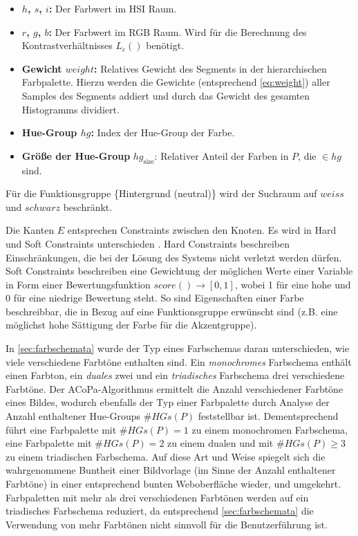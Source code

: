 \begin{itemize}
	\item \textbf{$h$, $s$, $i$:} Der Farbwert im HSI Raum.
	\item \textbf{$r$, $g$, $b$:} Der Farbwert im RGB Raum. Wird für die Berechnung des Kontrastverhältnisses $L_c()$ benötigt.
	\item \textbf{Gewicht $weight$:} Relatives Gewicht des Segments in der hierarchischen Farbpalette. Hierzu werden die Gewichte (entsprechend \autoref{eq:weight}) aller Samples des Segments addiert und durch das Gewicht des gesamten Histogramms dividiert.
	\item \textbf{Hue-Group $hg$:} Index der Hue-Group der Farbe.
	\item \textbf{Größe der Hue-Group} $hg_\text{size}$: Relativer Anteil der Farben in $P$, die $\in hg$ sind.
\end{itemize}

Für die Funktionsgruppe \{Hintergrund (neutral)\} wird der Suchraum auf $weiss$ und $schwarz$ beschränkt.

Die Kanten $E$ entsprechen Constraints zwischen den Knoten. Es wird in Hard und Soft Constraints unterschieden \citep{patterns}. Hard Constraints beschreiben Einschränkungen, die bei der Lösung des Systems nicht verletzt werden dürfen. Soft Constraints beschreiben eine Gewichtung der möglichen Werte einer Variable in Form einer Bewertungsfunktion $score() \to [0, 1]$, wobei 1 für eine hohe und 0 für eine niedrige Bewertung steht. So sind Eigenschaften einer Farbe beschreibbar, die in Bezug auf eine Funktionsgruppe erwünscht sind (z.B. eine möglichst hohe Sättigung der Farbe für die Akzentgruppe).

In \autoref{sec:farbschemata} wurde der Typ eines Farbschemas daran unterschieden, wie viele verschiedene Farbtöne enthalten sind. Ein \emph{monochromes} Farbschema enthält einen Farbton, ein \emph{duales} zwei und ein \emph{triadisches} Farbschema drei verschiedene Farbtöne. Der ACoPa-Algorithmus ermittelt die Anzahl verschiedener Farbtöne eines Bildes, wodurch ebenfalls der Typ einer Farbpalette durch Analyse der Anzahl enthaltener Hue-Groups $\#HGs(P)$ feststellbar ist. Dementsprechend führt eine Farbpalette mit $\#HGs(P) = 1$ zu einem monochromen Farbschema, eine Farbpalette mit $\#HGs(P) = 2$ zu einem dualen und mit $\#HGs(P) \geq 3$ zu einem triadischen Farbschema. Auf diese Art und Weise spiegelt sich die wahrgenommene \glqq{}Buntheit\grqq{} einer Bildvorlage (im Sinne der Anzahl enthaltener Farbtöne) in einer entsprechend bunten Weboberfläche wieder, und umgekehrt. Farbpaletten mit mehr als drei verschiedenen Farbtönen werden auf ein triadisches Farbschema reduziert, da entsprechend \autoref{sec:farbschemata} die Verwendung von mehr Farbtönen nicht sinnvoll für die Benutzerführung ist.

